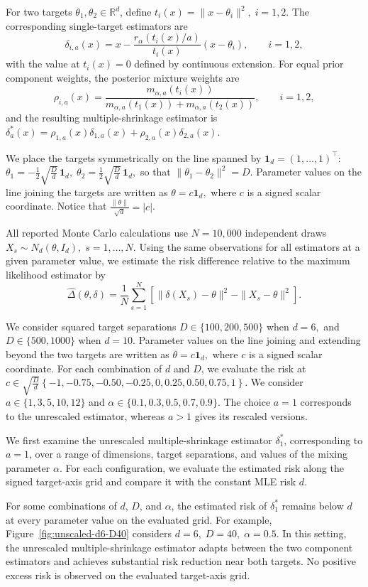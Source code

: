 \documentclass[11pt]{article}
\theoremstyle{definition}
\begin{document}
For two targets $\theta_1,\theta_2\in\mathbb{R}^d$, define $t_i(x)=\|x-\theta_i\|^2,
\; i=1,2.$ The corresponding single-target estimators are
\[
\delta_{i,a}(x)
=
x-
\frac{r_\alpha(t_i(x)/a)}
     {t_i(x)}
(x-\theta_i),
\qquad i=1,2,
\]
with the value at $t_i(x)=0$ defined by continuous extension.
For equal prior component weights, the posterior mixture weights are
\[
\rho_{i,a}(x)
=
\frac{
m_{\alpha,a}(t_i(x))
}{
m_{\alpha,a}(t_1(x))
+
m_{\alpha,a}(t_2(x))
},
\qquad i=1,2,
\]
and the resulting multiple-shrinkage estimator is $\delta_a^*(x)
=
\rho_{1,a}(x)\delta_{1,a}(x)
+
\rho_{2,a}(x)\delta_{2,a}(x).$

We place the targets symmetrically on the line spanned by
$\mathbf{1}_d=(1,\ldots,1)^\top$: $\theta_1
=
-\frac{1}{2}\sqrt{\frac{D}{d}}\,\mathbf{1}_d,
\; 
\theta_2
=
\frac{1}{2}\sqrt{\frac{D}{d}}\,\mathbf{1}_d,$
so that $\|\theta_1-\theta_2\|^2=D.$ Parameter values on the line joining the targets are written as $\theta=c\mathbf{1}_d,$ where $c$ is a signed scalar coordinate. Notice that $\frac{\|\theta\|}{\sqrt d}=|c|$.

All reported Monte Carlo calculations use $N=10,000$ independent draws $X_s\sim N_d(\theta,I_d),
\;s=1,\ldots,N.$ Using the same observations for all estimators at a given parameter value, we estimate the risk difference relative to the maximum
likelihood estimator by
\[
\widehat{\Delta}(\theta,\delta)
=
\frac1N
\sum_{s=1}^N
\left[
\|\delta(X_s)-\theta\|^2
-
\|X_s-\theta\|^2
\right].
\]

We consider squared target separations $D\in\{100,200,500\}$ when $d=6,$ and $D\in\{500,1000\}$ when $d=10.$ Parameter values on the line joining and extending beyond the two targets are written as $\theta=c\mathbf{1}_d,$ where $c$ is a signed scalar coordinate. For each combination of $d$ and $D$, we evaluate the risk at $c
\in
\sqrt{\frac{D}{d}}
\left\{
-1,-0.75,-0.50,-0.25,0,
0.25,0.50,0.75,1
\right\}.$ We consider $a\in\{1,3,5,10,12\}$ and $\alpha\in\{0.1,0.3,0.5,0.7,0.9\}.$ The choice $a=1$ corresponds to the unrescaled estimator, whereas $a>1$ gives its rescaled versions.


We first examine the unrescaled multiple-shrinkage estimator
$\delta_1^*$, corresponding to $a=1$, over a range of dimensions,
target separations, and values of the mixing parameter $\alpha$.
For each configuration, we evaluate the estimated risk along the
signed target-axis grid and compare it with the constant
MLE risk $d$.

For some combinations of $d$, $D$, and $\alpha$, the estimated risk
of $\delta_1^*$ remains below $d$ at every parameter value on the
evaluated grid. For example, Figure~\ref{fig:unscaled-d6-D40}
considers $d=6,\; D=40,\; \alpha=0.5.$ In this setting, the unrescaled multiple-shrinkage estimator adapts
between the two component estimators and achieves substantial risk reduction near both targets. No positive excess risk is observed on
the evaluated target-axis grid.
\end{document}
